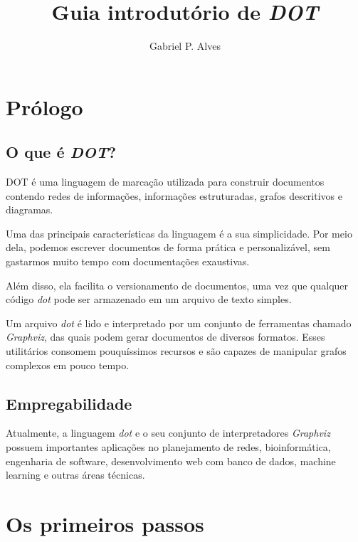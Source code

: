 \documentclass[a4paper,12pt]{article}
\begin{document}
  \title{\vspace{-1.5in} Guia introdutório de \emph{DOT}}
  \author{Gabriel P. Alves}
  \date{}
  \maketitle

  \section{Prólogo}

    \subsection{O que é \emph{DOT}?}
      DOT é uma linguagem de marcação
      utilizada para construir documentos
      contendo redes de informações,
      informações estruturadas, grafos
      descritivos e diagramas.

      Uma das principais características da
      linguagem é a sua simplicidade. Por
      meio dela, podemos escrever
      documentos de forma prática e
      personalizável, sem gastarmos muito
      tempo com documentações exaustivas.

      Além disso, ela facilita o
      versionamento de documentos, uma vez
      que qualquer código \emph{dot} pode ser
      armazenado em um arquivo de
      texto simples.

      Um arquivo \emph{dot} é lido e
      interpretado por um conjunto de
      ferramentas chamado \emph{Graphviz},
      das quais podem gerar documentos de
      diversos formatos. Esses utilitários
      consomem pouquíssimos recursos e são
      capazes de manipular grafos complexos
      em pouco tempo.

    \subsection{Empregabilidade}
      Atualmente, a linguagem \emph{dot} e
      o seu conjunto de interpretadores
      \emph{Graphviz} possuem importantes
      aplicações no planejamento de redes,
      bioinformática, engenharia de software,
      desenvolvimento web com banco de dados,
      machine learning e outras áreas técnicas.

    \break

  \section{Os primeiros passos}
\end{document}
